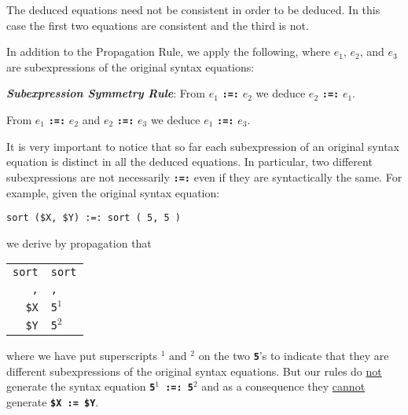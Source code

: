 \documentclass[12pt]{article}
\newcommand{\TT}[1]{{\tt \bfseries #1}}
\newcommand{\ikey}[2]{{\bf \em #1}\index{#2}}
\newenvironment{indpar}[1][0.3in]%
	{\begin{list}{}%
		     {\setlength{\itemsep}{0in}%
		      \setlength{\topsep}{0in}%
		      \setlength{\parsep}{1ex}%
		      \setlength{\labelwidth}{#1}%
		      \setlength{\leftmargin}{#1}%
		      \addtolength{\leftmargin}{\labelsep}}%
	 \item}%
	{\end{list}}
\begin{document}
The deduced equations need not be consistent in order to be deduced.
In this case the first two equations are consistent and the third is not.

In addition to the Propagation Rule, we apply the following, where
$e_1$, $e_2$, and $e_3$ are subexpressions of the original
syntax equations:

\begin{indpar}
\begin{list}{}{}
\item [\ikey{Subexpression Symmetry Rule}{subexpression!symmetry rule}:]%
\label{SUBEXPRESSION-SYMMETRY-RULE}
From $e_1$ \TT{:=:} $e_2$ we deduce $e_2$ \TT{:=:} $e_1$.

\item [\ikey{Subexpression Transitivity Rule}%
            {subexpression!transitivity rule}:]%
\label{SUBEXPRESSION-TRANSITIVITY-RULE}
From $e_1$ \TT{:=:} $e_2$ and $e_2$ \TT{:=:} $e_3$
we deduce $e_1$ \TT{:=:} $e_3$.

\end{list}
\end{indpar}

It is very important to notice that so far each subexpression of an
original syntax equation is distinct in all the deduced equations.
In particular, two different subexpressions
are not necessarily \TT{:=:} even if they are syntactically the same.
For example, given the original syntax equation:

\begin{center}
\verb/sort ($X, $Y) :=: sort ( 5, 5 )/
\end{center}

we derive by propagation that

\begin{center}
\begin{tabular}{r@\TT{~:=:~}l}
\verb/sort/ & \verb/sort/ \\
\verb/,/ & \verb/,/ \\
\verb/$X/ & \verb/5/$^1$ \\
\verb/$Y/ & \verb/5/$^2$ \\
\end{tabular}
\end{center}

where we have put superscripts $^1$ and $^2$ on the two \TT{5}'s to
indicate that they are different subexpressions of the original
syntax equations.  But our rules do \underline{not}
generate the syntax equation \TT{5$^1$ :=: 5$^2$} and as a consequence
they \underline{cannot} generate \TT{\$X := \$Y}.
\end{document}
